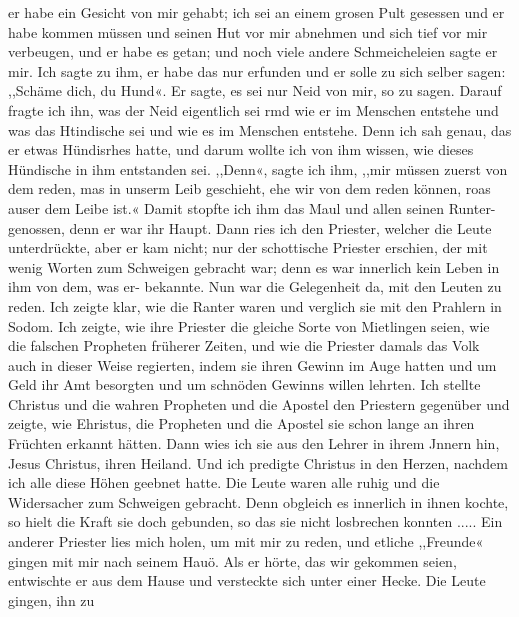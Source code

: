 er habe ein Gesicht von mir gehabt; ich sei an einem grosen Pult
gesessen und er habe kommen müssen und seinen Hut vor mir
abnehmen und sich tief vor mir verbeugen, und er habe es getan;
und noch viele andere Schmeicheleien sagte er mir. Ich sagte
zu ihm, er habe das nur erfunden und er solle zu sich selber
sagen: ,,Schäme dich, du Hund«. Er sagte, es sei nur Neid von
mir, so zu sagen. Darauf fragte ich ihn, was der Neid eigentlich
sei rmd wie er im Menschen entstehe und was das Htindische sei
und wie es im Menschen entstehe. Denn ich sah genau, das er
etwas Hündisrhes hatte, und darum wollte ich von ihm wissen,
wie dieses Hündische in ihm entstanden sei. ,,Denn«, sagte ich
ihm, ,,mir müssen zuerst von dem reden, mas in unserm Leib
geschieht, ehe wir von dem reden können, roas auser dem Leibe
ist.« Damit stopfte ich ihm das Maul und allen seinen Runter-
genossen, denn er war ihr Haupt. Dann ries ich den Priester,
welcher die Leute unterdrückte, aber er kam nicht; nur der schottische
Priester erschien, der mit wenig Worten zum Schweigen gebracht
war; denn es war innerlich kein Leben in ihm von dem, was er-
bekannte. Nun war die Gelegenheit da, mit den Leuten zu reden.
Ich zeigte klar, wie die Ranter waren und verglich sie mit den
Prahlern in Sodom. Ich zeigte, wie ihre Priester die gleiche
Sorte von Mietlingen seien, wie die falschen Propheten früherer
Zeiten, und wie die Priester damals das Volk auch in dieser
Weise regierten, indem sie ihren Gewinn im Auge hatten und
um Geld ihr Amt besorgten und um schnöden Gewinns willen
lehrten. Ich stellte Christus und die wahren Propheten und die
Apostel den Priestern gegenüber und zeigte, wie Ehristus, die
Propheten und die Apostel sie schon lange an ihren Früchten
erkannt hätten. Dann wies ich sie aus den Lehrer in ihrem
Jnnern hin, Jesus Christus, ihren Heiland. Und ich predigte
Christus in den Herzen, nachdem ich alle diese Höhen geebnet
hatte. Die Leute waren alle ruhig und die Widersacher zum
Schweigen gebracht. Denn obgleich es innerlich in ihnen kochte,
so hielt die Kraft sie doch gebunden, so das sie nicht losbrechen
konnten .....
Ein anderer Priester lies mich holen, um mit mir zu reden,
und etliche ,,Freunde« gingen mit mir nach seinem Hauö. Als
er hörte, das wir gekommen seien, entwischte er aus dem Hause
und versteckte sich unter einer Hecke. Die Leute gingen, ihn zu


